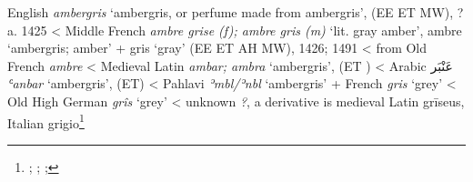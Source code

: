 \begin{etymology}\label{ety:ambergris}
English \textit{ambergris} `ambergris, or perfume made from ambergris', (EE ET MW), ?a. 1425
< Middle French \textit{ambre grise (f); ambre gris (m)} `lit. gray amber', ambre `ambergris; amber' + gris `gray' (EE ET AH MW), 1426; 1491
< from Old French \textit{ambre}
< Medieval Latin \textit{ambar; ambra} `ambergris', (ET )
< Arabic {عَنْبَر‎} \textit{ʿanbar} `ambergris', (ET)
< Pahlavi \textit{ʾmbl/ʾnbl } `ambergris'
 + French \textit{gris} `grey'
< Old High German \textit{grîs} `grey'
< unknown \textit{?}, a derivative is medieval Latin grīseus, Italian grigio\footnote{\textcite{oed}; \textcite{oed}; \textcite[8]{mackenzie_concise_1986}; }
\end{etymology}